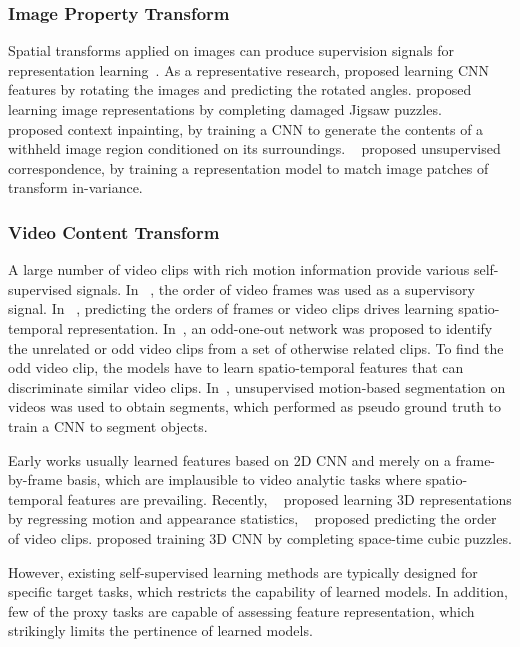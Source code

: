 \documentclass[letterpaper]{article}
\begin{document}
\subsubsection {Image Property Transform}
Spatial transforms applied on images can produce supervision signals for representation learning~\cite{larsson2017colorization}. As a representative research, \cite{gidaris2018unsupervised} proposed learning CNN features by rotating the images and predicting the rotated angles. \cite{kim2018learning,doersch2015unsupervised} proposed learning image representations by completing damaged Jigsaw puzzles. 
~\cite{Inpainting2016} proposed context inpainting, by training a CNN to generate the contents of a withheld image region conditioned on its surroundings.
~\cite{Invariance2017} proposed unsupervised correspondence, by training a representation model to match image patches of transform in-variance.

\subsubsection {Video Content Transform}
A large number of video clips with rich motion information provide various self-supervised signals. In ~\cite{WangXiaoLong2015}, the order of video frames was used as a supervisory signal. In ~\cite{misra2016shuffle,lee2017unsupervised}, predicting the orders of frames or video clips drives learning spatio-temporal representation. In~\cite{fernando2017self}, an odd-one-out network was proposed to identify the unrelated or odd video clips from a set of otherwise related clips. To find the odd video clip, the models have to learn spatio-temporal features that can discriminate similar video clips. In~\cite{WatchingMove2017}, unsupervised motion-based segmentation on videos was used to obtain segments, which performed as pseudo ground truth to train a CNN to segment objects.

Early works usually learned features based on 2D CNN and merely on a frame-by-frame basis, which are implausible to video analytic tasks where spatio-temporal features are prevailing.
Recently, ~\cite{wang2019self} proposed learning 3D representations by regressing motion and appearance statistics, ~\cite{xu2019self} proposed predicting the order of video clips. \cite{kim2019self} proposed training 3D CNN by completing space-time cubic puzzles.


However, existing self-supervised learning methods are typically designed for specific target tasks, which restricts the capability of learned models. In addition, few of the proxy tasks are capable of assessing feature representation, which strikingly limits the pertinence of learned models.
\end{document}
